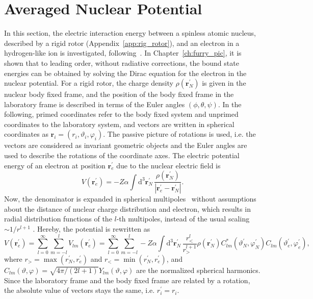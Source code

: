 \section{Averaged Nuclear Potential}
In this section, the electric interaction energy between a spinless atomic nucleus, described by a rigid rotor (Appendix~\ref{app:rig_rotor}), and an electron in a hydrogen-like ion is investigated, following~\cite{kozhedub2008,jacek2012}. In Chapter~\ref{ch:furry_pic}, it is shown that to leading order, without radiative corrections, the bound state energies can be obtained by solving the Dirac equation for the electron in the nuclear potential. For a rigid rotor, the charge density $\rho(\mathbf{r}^{\prime}_N)$ is given in the nuclear body fixed frame, and the position of the body fixed frame in the laboratory frame is described in terms of the Euler angles $(\phi,\theta,\psi)$. In the following, primed coordinates refer to the body fixed system and unprimed coordinates to the laboratory system, and vectors are written in spherical coordinates as $\mathbf{r}_i=(r_i,\vartheta_i,\varphi_i)$. The passive picture of rotations is used, i.e. the vectors are considered as invariant geometric objects and the Euler angles are used to describe the rotations of the coordinate axes. The electric potential energy of an electron at position $\mathbf{r}_{e}^\prime$ due to the nuclear electric field is
\begin{equation}
V(\mathbf{r}_e^\prime)=-Z\alpha \int\mathrm{d}^3\mathbf{r}_N^\prime\,
\frac{\rho(\mathbf{r}_N^\prime)}{\left|\mathbf{r}_e^\prime - \mathbf{r}_N^\prime\right|}.
\end{equation}
Now, the denominator is expanded in spherical multipoles~\cite{jackson1999} without assumptions about the distance of nuclear charge distribution and electron, which results in radial distribution functions of the $l$-th multipoles, instead of the usual scaling $\sim 1/r^{l+1}$ . Hereby, the potential is rewritten as
\begin{equation}
V(\mathbf{r}_e^\prime)=\sum_{l=0}^\infty \sum_{m=-l}^l V_{lm}(\mathbf{r}_e^\prime)= \sum_{l=0}^\infty \sum_{m=-l}^l
-Z\alpha\int\mathrm{d}^3\mathbf{r}_N^{\prime}\,\frac{r_<^l}{r_>^{l+1}}\rho(\mathbf{r}_N^\prime) C_{lm}^*(\vartheta^\prime_N,\varphi_N^\prime) C_{lm}(\vartheta^\prime_e,\varphi_e^\prime),
\label{eq:mulitipoles_1}
\end{equation}
where $r_>=\max(r^\prime_N,r^\prime_e)$ and $r_<=\min(r^\prime_N,r^\prime_e)$, and $C_{lm}(\vartheta,\varphi)=\sqrt{4\pi/(2l+1)}Y_{lm}(\vartheta,\varphi)$ are the normalized spherical harmonics. Since the laboratory frame and the body fixed frame are related by a rotation, the absolute value of vectors stays the same, i.e. $r^\prime_i = r_i$.
